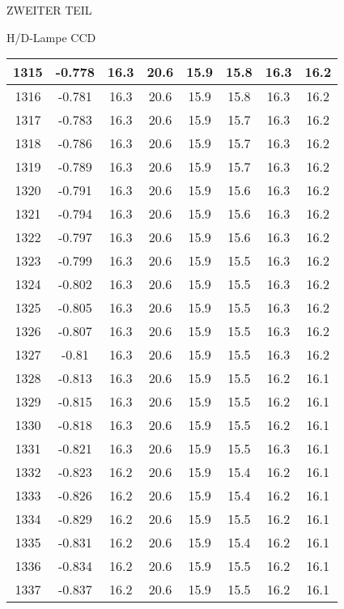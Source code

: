 \begin{appendix}
\begin{chapter}{ZWEITER TEIL}
\begin{section}{H/D-Lampe CCD}
\begin{scriptsize}
\begin{longtable}[htbp]{|c|c|c|c|c|c|c|c|}
            1315 & -0.778 & 16.3 & 20.6 & 15.9 & 15.8 & 16.3 & 16.2 \\ \hline
            1316 & -0.781 & 16.3 & 20.6 & 15.9 & 15.8 & 16.3 & 16.2 \\ \hline
            1317 & -0.783 & 16.3 & 20.6 & 15.9 & 15.7 & 16.3 & 16.2 \\ \hline
            1318 & -0.786 & 16.3 & 20.6 & 15.9 & 15.7 & 16.3 & 16.2 \\ \hline
            1319 & -0.789 & 16.3 & 20.6 & 15.9 & 15.7 & 16.3 & 16.2 \\ \hline
            1320 & -0.791 & 16.3 & 20.6 & 15.9 & 15.6 & 16.3 & 16.2 \\ \hline
            1321 & -0.794 & 16.3 & 20.6 & 15.9 & 15.6 & 16.3 & 16.2 \\ \hline
            1322 & -0.797 & 16.3 & 20.6 & 15.9 & 15.6 & 16.3 & 16.2 \\ \hline
            1323 & -0.799 & 16.3 & 20.6 & 15.9 & 15.5 & 16.3 & 16.2 \\ \hline
            1324 & -0.802 & 16.3 & 20.6 & 15.9 & 15.5 & 16.3 & 16.2 \\ \hline
            1325 & -0.805 & 16.3 & 20.6 & 15.9 & 15.5 & 16.3 & 16.2 \\ \hline
            1326 & -0.807 & 16.3 & 20.6 & 15.9 & 15.5 & 16.3 & 16.2 \\ \hline
            1327 & -0.81 & 16.3 & 20.6 & 15.9 & 15.5 & 16.3 & 16.2 \\ \hline
            1328 & -0.813 & 16.3 & 20.6 & 15.9 & 15.5 & 16.2 & 16.1 \\ \hline
            1329 & -0.815 & 16.3 & 20.6 & 15.9 & 15.5 & 16.2 & 16.1 \\ \hline
            1330 & -0.818 & 16.3 & 20.6 & 15.9 & 15.5 & 16.2 & 16.1 \\ \hline
            1331 & -0.821 & 16.3 & 20.6 & 15.9 & 15.5 & 16.3 & 16.1 \\ \hline
            1332 & -0.823 & 16.2 & 20.6 & 15.9 & 15.4 & 16.2 & 16.1 \\ \hline
            1333 & -0.826 & 16.2 & 20.6 & 15.9 & 15.4 & 16.2 & 16.1 \\ \hline
            1334 & -0.829 & 16.2 & 20.6 & 15.9 & 15.5 & 16.2 & 16.1 \\ \hline
            1335 & -0.831 & 16.2 & 20.6 & 15.9 & 15.4 & 16.2 & 16.1 \\ \hline
            1336 & -0.834 & 16.2 & 20.6 & 15.9 & 15.5 & 16.2 & 16.1 \\ \hline
            1337 & -0.837 & 16.2 & 20.6 & 15.9 & 15.5 & 16.2 & 16.1 \\ \hline

\end{longtable}
\end{scriptsize}
\end{section}
\end{chapter}
\end{appendix}
